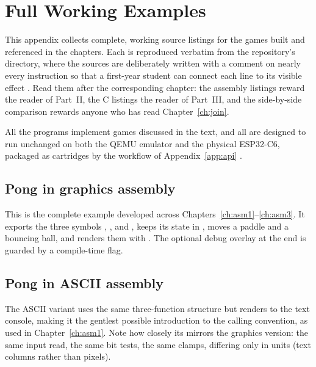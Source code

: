 \chapter{Full Working Examples}
\label{app:worked}

This appendix collects complete, working source listings for the games built and
referenced in the chapters. Each is reproduced verbatim from the \prg repository's
 directory, where the sources are deliberately written with a
comment on nearly every instruction so that a first-year student can connect each
line to its visible effect \citep{prg32repo}. Read them after the corresponding
chapter: the assembly listings reward the reader of Part~II, the C listings the
reader of Part~III, and the side-by-side comparison rewards anyone who has read
Chapter~\ref{ch:join}.

All the programs implement games discussed in the text, and all are designed
to run unchanged on both the QEMU emulator and the physical ESP32\nobreakdash-C6, packaged as
 cartridges by the workflow of Appendix~\ref{app:api}
\citep{prg32qemu}.

\section{Pong in graphics assembly}

This is the complete  example developed across
Chapters~\ref{ch:asm1}--\ref{ch:asm3}. It exports the three symbols
, , and
, keeps its state in , moves a paddle and a
bouncing ball, and renders them with . The optional debug
overlay at the end is guarded by a compile-time flag.



\section{Pong in ASCII assembly}

The ASCII variant uses the same three-function structure but renders to the text
console, making it the gentlest possible introduction to the calling convention,
as used in Chapter~\ref{ch:asm1}. Note how closely its  mirrors the
graphics version: the same input read, the same bit tests, the same clamps,
differing only in units (text columns rather than pixels).

